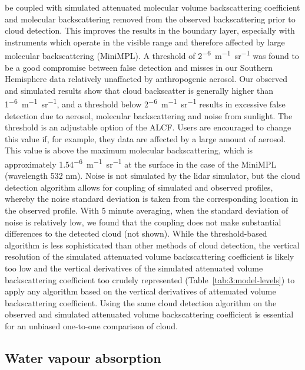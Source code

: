be coupled with simulated attenuated molecular volume backscattering coefficient
and molecular backscattering removed from the observed backscattering prior
to cloud detection. This improves the results in the boundary layer, especially
with instruments which operate in the visible range and therefore affected
by large molecular backscattering (MiniMPL).
A threshold of
2\unit{^{-6}m^{-1}sr^{-1}} was found to be a good compromise between false detection
and misses in our Southern Hemisphere data relatively unaffacted by anthropogenic aerosol.
Our observed and simulated results show that cloud backscatter
is generally higher than 1\unit{^{-6}m^{-1}sr^{-1}}, and a threshold
below 2\unit{^{-6}m^{-1}sr^{-1}} results in excessive false detection
due to aerosol, molecular backscattering and noise from sunlight. The threshold
is an adjustable option of the ALCF. Users are encouraged to change this value
if, for example, they data are affected by a large amount of aerosol.
This value is above the maximum molecular backscattering,
which is approximately 1.54\unit{^{-6}m^{-1}sr^{-1}} at the
surface in the case of the MiniMPL (wavelength 532 nm).
Noise is not simulated by the lidar simulator, but the cloud detection
algorithm allows for coupling of simulated and observed profiles, whereby
the noise standard deviation is taken from the corresponding location in the
observed profile. With 5 minute averaging, when the standard deviation of noise
is relatively low, we found that the coupling does not make substantial
differences to the detected cloud (not shown). While the threshold-based algorithm is
less sophisticated than other methods of cloud detection, the vertical
resolution of the simulated attenuated volume backscattering coefficient is likely too low and the vertical
derivatives of the simulated attenuated volume backscattering coefficient too crudely represented (Table~\ref{tab:3:model-levels}) to apply any algorithm
based on the vertical derivatives of attenuated volume backscattering coefficient. Using the same cloud detection
algorithm on the observed and simulated attenuated volume backscattering coefficient is essential for an unbiased
one-to-one comparison of cloud.

\subsection{Water vapour absorption}
\label{sec:3:water-vapour-absorption}

